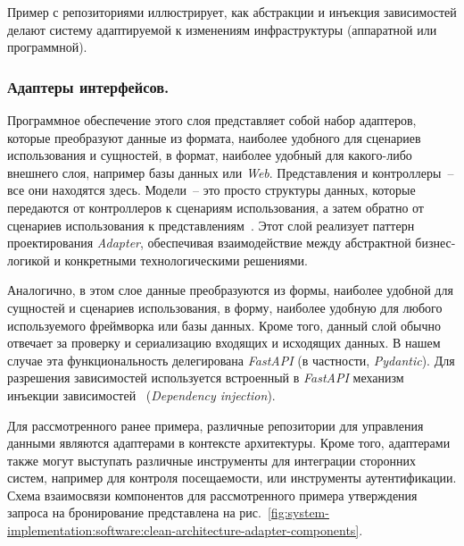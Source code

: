 Пример с репозиториями иллюстрирует, как абстракции и инъекция зависимостей делают систему адаптируемой к изменениям инфраструктуры (аппаратной или программной).

\subsubsection{Адаптеры интерфейсов. }

Программное обеспечение этого слоя представляет собой набор адаптеров, которые преобразуют данные из формата, наиболее удобного для сценариев использования и сущностей, в формат, наиболее удобный для какого-либо внешнего слоя, например базы данных или \textit{Web}. Представления и контроллеры~-- все они находятся здесь. Модели~-- это просто структуры данных, которые передаются от контроллеров к сценариям использования, а затем обратно от сценариев использования к представлениям~\cite{book_clean_architecture}. Этот слой реализует паттерн проектирования \textit{Adapter}, обеспечивая взаимодействие между абстрактной бизнес-логикой и конкретными технологическими решениями.

Аналогично, в этом слое данные преобразуются из формы, наиболее удобной для сущностей и сценариев использования, в форму, наиболее удобную для любого используемого фреймворка или базы данных. Кроме того, данный слой обычно отвечает за проверку и сериализацию входящих и исходящих данных. В нашем случае эта функциональность делегирована \textit{FastAPI} (в частности, \textit{Pydantic}). Для разрешения зависимостей используется встроенный в \textit{FastAPI} механизм инъекции зависимостей~\cite{book_lubanovich_fastapi} (\textit{Dependency injection}).

Для рассмотренного ранее примера, различные репозитории для управления данными являются адаптерами в контексте архитектуры. Кроме того, адаптерами также могут выступать различные инструменты для интеграции сторонних систем, например для контроля посещаемости, или инструменты аутентификации. Схема взаимосвязи компонентов для рассмотренного примера утверждения запроса на бронирование представлена на рис.~\ref{fig:system-implementation:software:clean-architecture-adapter-components}.

